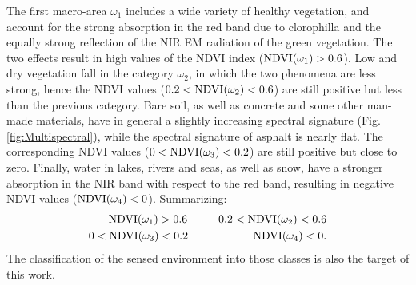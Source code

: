 \documentclass[letterpaper, 10pt, conference]{ieeeconf}      %
\begin{document}
The first macro-area $\omega_1$ includes a wide variety of healthy vegetation, and account for the strong absorption in the red band due to clorophilla and the equally strong reflection of the NIR EM radiation of the green vegetation.
The two effects result in high values of the NDVI index  ($\rm{NDVI({\omega_1})}>0.6$).
Low and dry vegetation fall in the category $\omega_2$,  in which the two phenomena are less strong, hence the NDVI values  ($0.2<\rm{NDVI(\omega_2)}<0.6$) are still positive but less than the previous category.
Bare soil, as well as concrete and some other man-made materials, have in general a slightly increasing spectral signature (Fig. \ref{fig:Multispectral}), while the spectral signature of asphalt is nearly flat.
The corresponding NDVI values ($ 0<\rm{NDVI(\omega_3)}<0.2$) are still positive but close to zero.
Finally, water in lakes, rivers and seas, as well as snow, have a stronger absorption in the NIR band with respect to the red band, resulting in negative NDVI values ($\rm{NDVI(\omega_4)}<0$).
%
Summarizing:
%
\begin{eqnarray}  \label{ndvi_values}
     \;\;  \rm{NDVI(\omega_1)}>0.6 \;\;\;\;\;\;\;\;\;\; 0.2<\rm{NDVI(\omega_2)}<0.6 \nonumber\\
        0<\rm{NDVI(\omega_3)}<0.2 \;\;\;\;\; \;\;\;\;\;\;\;\;\;\;\;\;\;\;\;\;  \rm{NDVI(\omega_4)}<0.
\end{eqnarray}
The classification of the sensed environment into those classes is also the target of this work.
\end{document}

